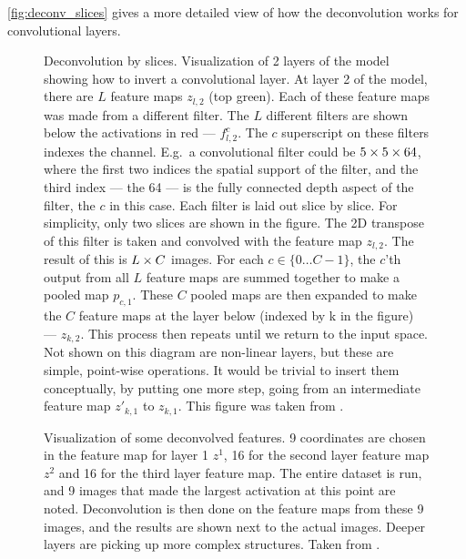   \autoref{fig:deconv_slices} gives a more detailed view of how the
  deconvolution works for convolutional layers.
  \begin{figure}
    \centering
      \caption[Deconvolution by slices]
              {Deconvolution by slices. 
              Visualization of 2 layers of the model showing how to invert
              a convolutional layer. At layer 2 of the model, there are $L$ feature
              maps $z_{l,2}$ (top green). Each of these feature
              maps was made from a different filter. The $L$ different filters
              are shown below the activations in red --- $f^c_{l,2}$. The
              $c$ superscript on these filters indexes the channel. E.g.\
              a convolutional filter could be $5\times 5\times 64$, where the first two
              indices the spatial support of the filter, and the third index
              --- the 64 --- is the fully connected depth aspect of the filter,
              the $c$ in this case. Each filter is laid out slice by slice. For
              simplicity, only two slices are shown in the figure. The
              2D transpose of this filter is taken and convolved with the
              feature map $z_{l,2}$. The result of this is $L\times C$ images. For
              each $c \in \{0\ldots C-1\}$, the $c$'th output from all $L$
              feature maps are summed together to make a pooled map $p_{c,1}$.
              These $C$ pooled maps are then expanded to make the $C$ feature
              maps at the layer below (indexed by k in the figure) --- $z_{k,2}$. 
              This process then repeats
              until we return to the input space. Not shown on this diagram are
              non-linear layers, but these are simple, point-wise operations.
              It would be trivial to insert them conceptually, by putting one
              more step, going from an intermediate feature map $z'_{k,1}$ to
              $z_{k,1}$. This figure was taken from
              \citep{zeiler_adaptive_2011}.}
      \label{fig:deconv_slices}
  \end{figure}

  \begin{figure}
    \centering
      \caption[Visualization of deconvolved features]
              {Visualization of some deconvolved features.  9 coordinates are chosen in the
              feature map for layer 1 $z^1$, 16 for the second layer
              feature map $z^2$ and 16 for the third layer feature map.
              The entire dataset is run, and 9 images that made the largest
              activation at this point are noted. Deconvolution is then done on
              the feature maps from these 9 images, and the results are shown
              next to the actual images. Deeper layers are picking up more
              complex structures. Taken from \citep{zeiler_visualizing_compact_2014}.}
  \end{figure}


